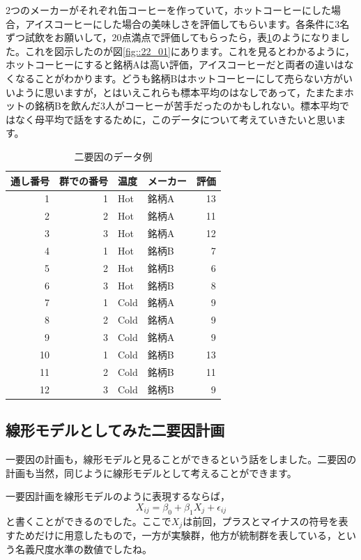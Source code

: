 \documentclass{ltjsarticle}
\begin{document}
2つのメーカーがそれぞれ缶コーヒーを作っていて，ホットコーヒーにした場合，アイスコーヒーにした場合の美味しさを評価してもらいます。各条件に3名ずつ試飲をお願いして，20点満点で評価してもらったら，表\ref{tbl::22_01}のようになりました。これを図示したのが図\ref{fig::22_01}にあります。これを見るとわかるように，ホットコーヒーにすると銘柄Aは高い評価，アイスコーヒーだと両者の違いはなくなることがわかります。どうも銘柄Bはホットコーヒーにして売らない方がいいように思いますが，とはいえこれらも標本平均のはなしであって，たまたまホットの銘柄Bを飲んだ3人がコーヒーが苦手だったのかもしれない。標本平均ではなく母平均で話をするために，このデータについて考えていきたいと思います。
\begin{table}[ht]
  \centering
  \caption{二要因のデータ例} 
  \begin{tabular}{rrllr}
    \hline
  通し番号 & 群での番号 & 温度 & メーカー & 評価 \\ 
    \hline
  1 & 1 & Hot & 銘柄A & 13 \\ 
    2 & 2 & Hot & 銘柄A & 11 \\ 
    3 & 3 & Hot & 銘柄A & 12 \\ 
    4 & 1 & Hot & 銘柄B & 7 \\ 
    5 & 2 & Hot & 銘柄B & 6 \\ 
    6 & 3 & Hot & 銘柄B & 8 \\ 
    7 & 1 & Cold & 銘柄A & 9 \\ 
    8 & 2 & Cold & 銘柄A & 9 \\ 
    9 & 3 & Cold & 銘柄A & 9 \\ 
    10 & 1 & Cold & 銘柄B & 13 \\ 
    11 & 2 & Cold & 銘柄B & 11 \\ 
    12 & 3 & Cold & 銘柄B & 9 \\ 
     \hline
  \end{tabular}

  \label{tbl::22_01}
  \end{table}


\subsection{線形モデルとしてみた二要因計画}
一要因の計画も，線形モデルと見ることができるという話をしました。二要因の計画も当然，同じように線形モデルとして考えることができます。

一要因計画を線形モデルのように表現するならば，
$$ X_{ij} = \beta_0 + \beta_1 X_j + \epsilon_{ij} $$
と書くことができるのでした。ここで$X_j$は前回，プラスとマイナスの符号を表すためだけに用意したもので，一方が実験群，他方が統制群を表している，という名義尺度水準の数値でしたね。
\end{document}
